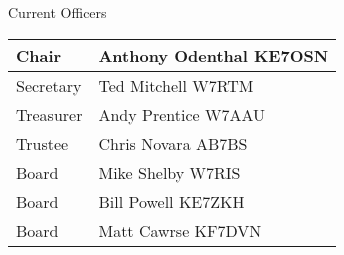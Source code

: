 	Current Officers \\
	\begin{tabular}{|l|l|} \hline
		Chair & Anthony Odenthal KE7OSN \\ \hline
		Secretary & Ted Mitchell W7RTM \\ \hline
		Treasurer & Andy Prentice W7AAU \\ \hline
		Trustee & Chris Novara AB7BS \\ \hline
		Board & Mike Shelby W7RIS \\ \hline
		Board & Bill Powell KE7ZKH \\ \hline
		Board & Matt Cawrse KF7DVN \\ \hline
	\end{tabular}
	
	\subsection*{\color{red}{Next Meeting: Monday 15 May 2017 at 19:00.}}

